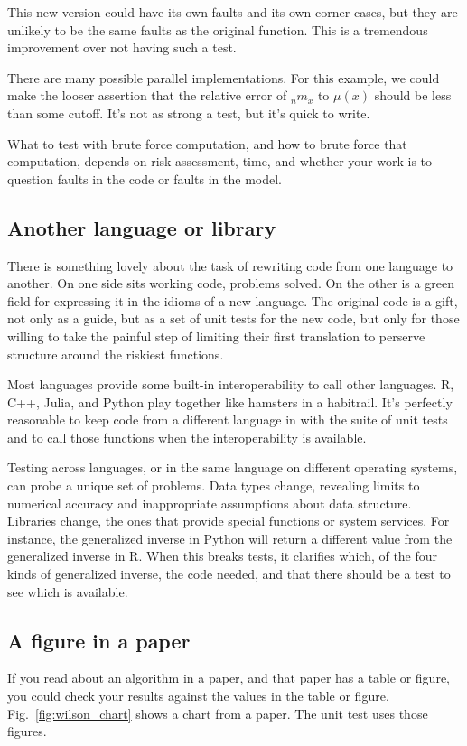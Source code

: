 \documentclass[fleqn,10pt]{olplainarticle}
\begin{document}
This new version could have its own faults and its
own corner cases, but they are unlikely to be the same faults
as the original function. This is a tremendous improvement over
not having such a test.

There are many possible parallel implementations. For this example,
we could make the looser assertion that the relative error of ${}_nm_x$
to $\mu(x)$ should be less than some cutoff. It's not as strong a test,
but it's quick to write.

What to test with brute force computation, and how to brute
force that computation, depends on risk assessment, time, and
whether your work is to question faults in the code or faults
in the model.



\subsection{Another language or library}

There is something lovely about the task of rewriting code from
one language to another. On one side sits working code, problems
solved. On the other is a green field for expressing it in the idioms
of a new language. The original code is a gift, not only as a guide,
but as a set of unit tests for the new code, but only for those
willing to take the painful step of limiting their first translation
to perserve structure around the riskiest functions.

Most languages provide some built-in interoperability to call
other languages. R, C++, Julia, and Python play together like hamsters
in a habitrail. It's perfectly reasonable to keep code from
a different language in with the suite of unit tests and to
call those functions when the interoperability is available.

Testing across languages, or in the same language on different
operating systems, can probe a unique set of problems. Data types
change, revealing limits to numerical accuracy and inappropriate
assumptions about data structure. Libraries change, the ones that
provide special functions or system services. For instance, the
generalized inverse in Python will return a different value
from the generalized inverse in R. When this breaks tests, it
clarifies which, of the four kinds of generalized inverse,
the code needed, and that there should be a test to see which
is available.


\subsection{A figure in a paper}
If you read about an algorithm in a paper, and that paper has a table or figure,
you could check your results against the values in the table or figure.
Fig.~\ref{fig:wilson_chart} shows a chart from a paper. The unit test
uses those figures.
\end{document}
